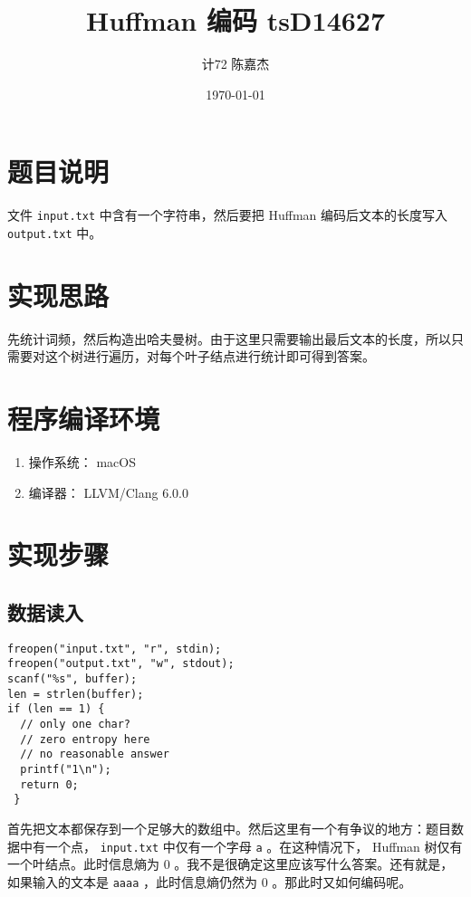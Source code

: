 \documentclass[11pt]{article}
\author{计72 陈嘉杰}
\date{\today}
\title{Huffman 编码 tsD14627}
\begin{document}
\maketitle
\tableofcontents

\section{题目说明}
\label{sec:org90d842e}
文件 \texttt{input.txt} 中含有一个字符串，然后要把 Huffman 编码后文本的长度写入 \texttt{output.txt} 中。

\section{实现思路}
\label{sec:org282ecfd}
先统计词频，然后构造出哈夫曼树。由于这里只需要输出最后文本的长度，所以只需要对这个树进行遍历，对每个叶子结点进行统计即可得到答案。

\section{程序编译环境}
\label{sec:org3f67926}
\begin{enumerate}
\item 操作系统： macOS
\item 编译器： LLVM/Clang 6.0.0
\end{enumerate}

\section{实现步骤}
\label{sec:orgcc11c91}
\subsection{数据读入}
\label{sec:org74b1706}
\begin{verbatim}
freopen("input.txt", "r", stdin);
freopen("output.txt", "w", stdout);
scanf("%s", buffer);
len = strlen(buffer);
if (len == 1) {
  // only one char?
  // zero entropy here
  // no reasonable answer
  printf("1\n");
  return 0;
 }
\end{verbatim}

首先把文本都保存到一个足够大的数组中。然后这里有一个有争议的地方：题目数据中有一个点， \texttt{input.txt} 中仅有一个字母 \texttt{a} 。在这种情况下， Huffman 树仅有一个叶结点。此时信息熵为 0 。我不是很确定这里应该写什么答案。还有就是，如果输入的文本是 \texttt{aaaa} ，此时信息熵仍然为 0 。那此时又如何编码呢。
\end{document}
